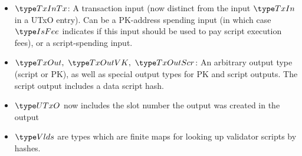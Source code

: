 \begin{itemize}
  \item $\TxInTx$: A transaction input (now distinct from the input $\TxIn$ in
  a UTxO entry). Can be a PK-address spending input
  (in which case $\IsFee$ indicates if this input should be used to pay script execution
  fees), or a script-spending input.

  \item $\TxOut,~\TxOutVK,~\TxOutScr$: An arbitrary output type (script or PK),
  as well as special output types for PK and script outputs. The script output
  includes a data script hash.

  \item $\UTxO$ now includes the slot number the output was created in the
  output

  \item $\Vlds$ are types which are finite maps for looking up
  validator scripts by hashes.
\end{itemize}


